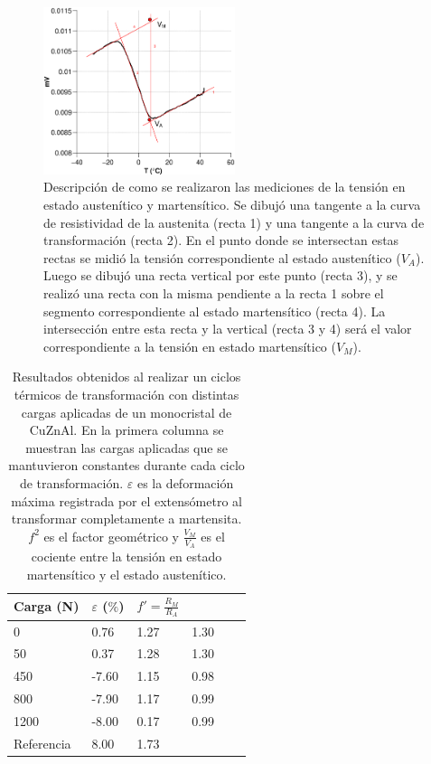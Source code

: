 \documentclass[a4paper,12pt,fleqn,twoside,openany]{book}
\begin{document}
 \begin{figure}[h]
 \centering
 \includegraphics[width=0.5\textwidth]{Img/Resultados/Resistencia/MonocristalMediciones.eps}
 \caption{Descripción de como se realizaron las mediciones de la tensión en estado austenítico y martensítico. Se dibujó una tangente a la curva de resistividad de la austenita (recta 1) y una tangente a la curva de transformación (recta 2). En el punto donde se intersectan estas rectas se midió la tensión correspondiente al estado austenítico ($V_A$). Luego se dibujó una recta vertical por este punto (recta 3), y se realizó una recta con la misma pendiente a la recta 1 sobre el segmento correspondiente al estado martensítico (recta 4). La intersección entre esta recta  y la vertical (recta 3 y 4) será el valor correspondiente a la tensión en estado martensítico ($V_M$).} 
 \label{fig:MonocristalMediciones}
 \end{figure}

\begin{table} 
\begin{center} 
\begin{tabular}{@{}llllll@{}} \toprule
Carga (N) & $\varepsilon$ ($\%$) &  $f'=\frac{R_M}{R_A}$  \\ \midrule
 0        &  0.76   & 1.27 & 1.30  \\
 50       &  0.37   & 1.28 & 1.30  \\
 450      &  -7.60  & 1.15 & 0.98  \\
 800      &  -7.90  & 1.17 &  0.99 \\
 1200     &  -8.00  & 0.17 &  0.99 \\
 Referencia \cite{resistencia}    & 8.00  &  1.73   \\
 \bottomrule
\end{tabular}
\caption{Resultados obtenidos al realizar un ciclos térmicos de transformación con distintas cargas aplicadas de un monocristal de CuZnAl. En la primera columna se muestran las cargas aplicadas que se mantuvieron constantes durante cada ciclo de transformación. $\varepsilon$ es la deformación máxima registrada por el extensómetro al transformar completamente a martensita. $f^2$ es el factor geométrico y $\frac{V_M}{V_A}$ es el cociente entre la tensión en estado martensítico y el estado austenítico.}
\label{tab:TablaMonocristal}
\end{center}
\end{table}
\end{document}
